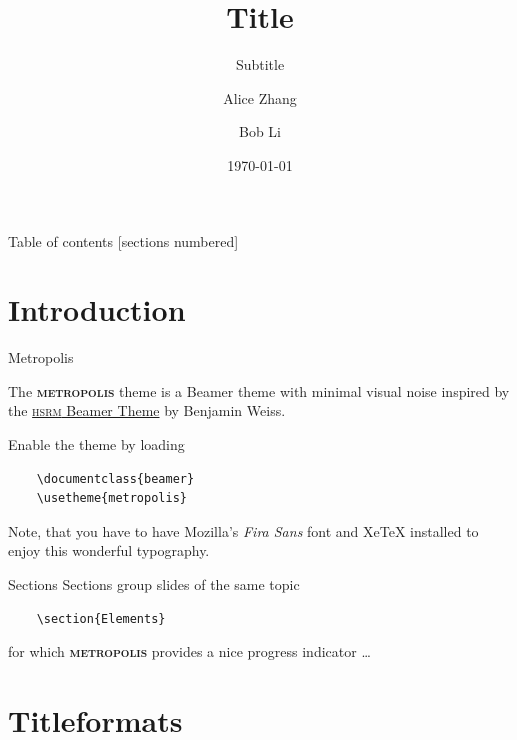 \documentclass[10pt, aspectratio=169]{beamer}
\title{Title}
\subtitle{Subtitle}
\date{\today}
\author[Zhang, Li]{%
  Alice Zhang\inst{1} \and
  Bob Li\inst{2}
}
\institute[LBS]{%
  \inst{1} London Business School \\
  \inst{2} Peking University
}
\newcommand{\themename}{\textbf{\textsc{metropolis}}\xspace}
\begin{document}
{
\begin{frame}[standout]
  \maketitle
\end{frame}
}



\begin{frame}{Table of contents}
  [sections numbered]
  \tableofcontents%
\end{frame}

\section[Intro]{Introduction}

\begin{frame}[fragile]{Metropolis}

  The \themename theme is a Beamer theme with minimal visual noise
  inspired by the \href{https://github.com/hsrmbeamertheme/hsrmbeamertheme}{\textsc{hsrm} Beamer
  Theme} by Benjamin Weiss.

  Enable the theme by loading

  \begin{verbatim}    \documentclass{beamer}
    \usetheme{metropolis}\end{verbatim}

  Note, that you have to have Mozilla's \emph{Fira Sans} font and XeTeX
  installed to enjoy this wonderful typography.
\end{frame}
\begin{frame}[fragile]{Sections}
  Sections group slides of the same topic

  \begin{verbatim}    \section{Elements}\end{verbatim}

  for which \themename provides a nice progress indicator \ldots
  
\end{frame}

\section{Titleformats}
\end{document}
